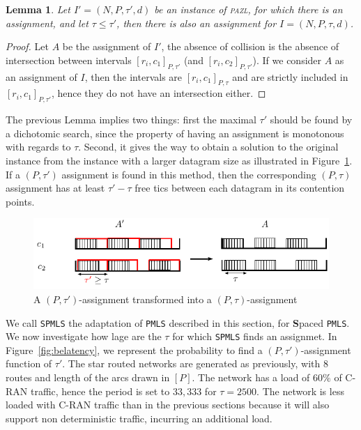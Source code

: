 \documentclass[a4paper,10pt]{article}
\newcommand\PMLS{\texttt{PMLS}\xspace}
\newcommand\SPMLS{\texttt{SPMLS}\xspace}
\newtheorem{lemma}[theorem]{Lemma}
\newcommand\pazl{\textsc{pazl}\xspace}
\begin{document}
    \begin{lemma}\label{lemma:smaller_tau}
    Let $I' = (N,P,\tau',d)$ be an instance of \pazl, for which there is an assignment, and let 
    $\tau \leq \tau'$, then there is also an assignment for $I = (N,P,\tau,d)$.
    \end{lemma}  
    \begin{proof}
    Let $A$ be the assignment of $I'$, the absence of collision is the absence of 
    intersection between intervals $[r_i,c_1]_{P,\tau'}$ (and $[r_i,c_2]_{P,\tau'}$). 
    If we consider $A$ as an assignment of $I$, then the intervals are $[r_i,c_1]_{P,\tau}$ and 
    are strictly included in $[r_i,c_1]_{P,\tau'}$, hence they do not have an intersection either. 
    \end{proof}

    The previous Lemma implies two things: first the maximal $\tau'$ should be found by a dichotomic search,
    since the property of having an assignment is monotonous with regards to $\tau$. Second, it gives the way to obtain a solution to the original instance from the instance with a larger datagram size as illustrated in Figure~\ref{fig:space}. If a $(P,\tau')$ assignment is found in this method, then the corresponding 
    $(P,\tau)$ assignment has at least $\tau' - \tau$ free tics between each datagram in its contention points. 

           \begin{figure}
       \begin{center}
      \includegraphics[width = \textwidth]{space.pdf}
      \end{center} 
      \caption{A $(P,\tau')$-assignment transformed into a $(P,\tau)$-assignment}
      \label{fig:space}   
     \end{figure}   


    We call \SPMLS the adaptation of \PMLS described in this section, for \textbf{S}paced \PMLS.
	We now investigate how lage are the $\tau$ for which \SPMLS finds an assignmet. In Figure~\ref{fig:belatency}, we represent the probability to find a $(P,\tau')$-assignment function of $\tau'$.
	The star routed networks are generated as previously, with $8$ routes and length of the arcs drawn in $[P]$. The network has a load of $60\%$ of C-RAN traffic, hence the period is set to $33,333$ for $\tau = 2500$. The network is less loaded with C-RAN traffic than in the previous sections because it will also support non deterministic traffic, incurring an additional load.
\end{document}
